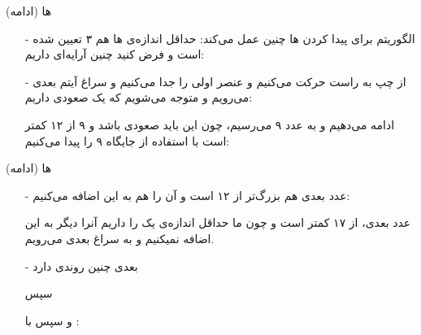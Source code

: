 \begin{frame}{ها (ادامه)}
\begin{itemize}\itemr
\item[-]
الگوریتم برای پیدا کردن ها چنین عمل می‌کند: حداقل اندازه‌ی ها هم ۳ تعیین شده است و فرض کنید چنین آرایه‌ای داریم:
\begin{lfl}
\m{[8, 12, 9, 17, 15, -1, 22, 11, 10, 7]}
\end{lfl}

\item[-]
از چپ به راست حرکت می‌کنیم و عنصر اولی را جدا می‌کنیم و سراغ آیتم بعدی می‌رویم و متوجه می‌شویم که یک  صعودی داریم:
\begin{lfl}
\m{[\,\underbrace{\m{8, 12}}_{R_1}, 9, 17, 15, -1, 22, 11, 10, 7]}
\end{lfl}

ادامه ‌می‌دهیم و به عدد ۹ می‌رسیم، چون این  باید صعودی باشد و ۹ از ۱۲ کمتر است با استفاده از  جایگاه ۹ را پیدا می‌کنیم:
\begin{lfl}
\m{[\,\underbrace{\m{8, 9, 12}}_{R_1}, 17, 15, -1, 22, 11, 10, 7]}
\end{lfl}
\end{itemize}
\end{frame}

\begin{frame}{ها (ادامه)}
\begin{itemize}\itemr
\item[-]
عدد بعدی هم بزرگ‌تر از ۱۲ است و آن را هم به این  اضافه می‌کنیم:
\begin{lfl}
\m{[\,\underbrace{\m{8, 9, 12, 17}}_{R_1}, 15, -1, 22, 11, 10, 7]}
\end{lfl}
عدد بعدی، از ۱۷ کمتر است و چون ما حداقل اندازه‌ی یک  را داریم آنرا دیگر به این  اضافه نمیکنیم و به سراغ  بعدی می‌رویم.

\item[-]
 بعدی چنین روندی دارد
\begin{lfl}
\end{lfl}
سپس 
\begin{lfl}
\end{lfl}
و سپس با :
\begin{lfl}
\end{lfl}
\end{itemize}
\end{frame}

